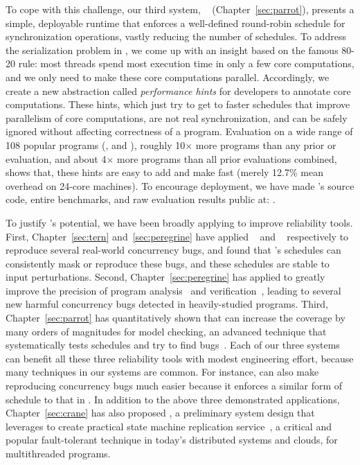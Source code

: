 To cope with this challenge, our third \smt system, \parrot~\cite{parrot:sosp13}
(Chapter~\ref{sec:parrot}), presents a simple, deployable runtime that enforces
a well-defined round-robin schedule for synchronization operations, vastly
reducing the number of schedules. To address the serialization problem in \smt,
we come up with an insight based on the famous 80-20 rule: most threads spend
most execution time in only a few core computations, and we only need to make 
these core computations parallel. Accordingly, we create a new abstraction
called \emph{performance hints} for developers to annotate core computations.
These hints, which just try to get to faster schedules that improve parallelism
of core computations, are not real synchronization, and can be safely ignored
without affecting correctness of a program. Evaluation on a wide range of 108
popular programs (\eg, \bdb and \mplayer), roughly 10$\times$ more programs than
any prior \smt or \dmt evaluation, and about 4$\times$ more programs than all
prior evaluations combined, shows that, these hints are easy to add and make
\parrot fast (merely 12.7\% mean overhead on 24-core machines). To encourage
deployment, we have made \parrot's source code, entire benchmarks, and raw
evaluation results public at: \github.

To justify \smt's potential, we have been broadly applying \smt to improve
reliability tools. First, Chapter~\ref{sec:tern} and~\ref{sec:peregrine} have
applied \tern~\cite{cui:tern:osdi10} and \peregrine~\cite{peregrine:sosp11}
respectively to reproduce several real-world concurrency bugs, and found that
\smt's schedules can consistently mask or reproduce these bugs, and these
schedules are stable to input perturbations. Second, Chapter~\ref{sec:peregrine}
has applied \peregrine to greatly improve the precision of program
analysis~\cite{wu:pldi12} and verification~\cite{wu:pldi12}, leading to several
new harmful concurrency bugs detected in heavily-studied programs. Third,
Chapter~\ref{sec:parrot}
has quantitatively shown that \parrot can increase the coverage by many orders
of magnitudes for model checking, an advanced technique that systematically
tests schedules and try to find bugs~\cite{parrot:sosp13, dbug:spin11,
modist:nsdi09}. Each of our three \smt systems can benefit all these three
reliability tools with modest engineering effort, because many techniques
in our \smt systems are common. For instance, \parrot can also make
reproducing concurrency bugs much easier because it enforces a similar form
of schedule to that in \tern. In addition to the above three demonstrated \smt
applications, Chapter~\ref{sec:crane} has also proposed \crane, a preliminary
system design that leverages \smt to create practical state machine replication
service~\cite{paxos:practical}, a critical and popular fault-tolerant technique
in today's distributed systems and clouds, for multithreaded programs.

